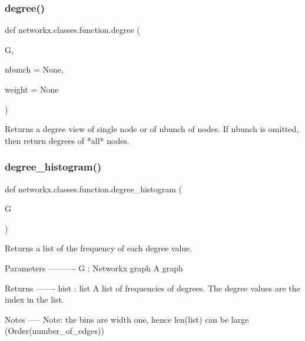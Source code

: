 \subsubsection{\texorpdfstring{degree()}{degree()}}
{\footnotesize\ttfamily def networkx.\+classes.\+function.\+degree (\begin{DoxyParamCaption}\item[{}]{G,  }\item[{}]{nbunch = {\ttfamily None},  }\item[{}]{weight = {\ttfamily None} }\end{DoxyParamCaption})}

\begin{DoxyVerb}Returns a degree view of single node or of nbunch of nodes.
If nbunch is omitted, then return degrees of *all* nodes.
\end{DoxyVerb}
 \mbox{\label{namespacenetworkx_1_1classes_1_1function_a43770941c72d38ec396414f0df0f8bae}} 
\subsubsection{\texorpdfstring{degree\+\_\+histogram()}{degree\_histogram()}}
{\footnotesize\ttfamily def networkx.\+classes.\+function.\+degree\+\_\+histogram (\begin{DoxyParamCaption}\item[{}]{G }\end{DoxyParamCaption})}

\begin{DoxyVerb}Returns a list of the frequency of each degree value.

Parameters
----------
G : Networkx graph
   A graph

Returns
-------
hist : list
   A list of frequencies of degrees.
   The degree values are the index in the list.

Notes
-----
Note: the bins are width one, hence len(list) can be large
(Order(number_of_edges))
\end{DoxyVerb}
 \mbox{\label{namespacenetworkx_1_1classes_1_1function_a01d2dff9da6b86469aa19819cfbd2710}} 
